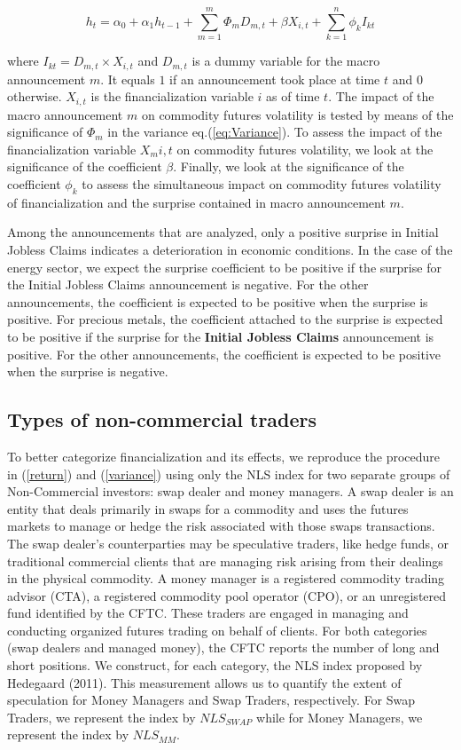 \documentclass[12pt]{article}
\begin{document}
\begin{equation}\label{eq:Variance}
h_{t}=\alpha_0+\alpha_1 h_{t-1}+\sum_{m=1}^m \Phi_m D_{m,t}+\beta X_{i,t}+\sum_{k=1}^n \phi_k I_{kt}
\end{equation}

where $I_{kt}=D_{m,t} \times X_{i,t}$ and $D_{m,t}$ is a dummy variable for the macro announcement $m$. It equals $1$ if an announcement took place at time $t$ and 0 otherwise. $X_{i,t}$  is the financialization variable $i$ as of time $t$. The impact of the macro announcement $m$ on commodity futures volatility is tested by means of the significance of $\Phi_m$ in the variance eq.(\ref{eq:Variance}). To assess the impact of the financialization variable $X_m{i,t}$ on commodity futures volatility, we look at the significance of the coefficient $\beta$. Finally, we look at the significance of the coefficient $\phi_k$ to assess the simultaneous impact on commodity futures volatility of  financialization  and the surprise contained in macro announcement $m$. 

Among the announcements that are analyzed, only a positive surprise in Initial Jobless Claims indicates a deterioration in economic conditions. In the case of the energy sector, we expect the surprise coefficient to be positive if the surprise for the Initial Jobless Claims announcement is negative. For the other announcements, the coefficient is expected to be positive when the surprise is positive. For precious metals, the coefficient attached to the surprise is expected to be positive if the surprise for the \textbf{Initial Jobless Claims} announcement is positive. For the other announcements, the coefficient is expected to be positive when the surprise is negative.

\subsection{Types of non-commercial traders}
To better categorize financialization and its effects, we reproduce the procedure in (\ref{return})  and (\ref{variance}) using only the NLS index for two separate groups of Non-Commercial investors: swap dealer and money managers. A swap dealer is an entity that deals primarily in swaps for a commodity and uses the futures markets to manage or hedge the risk associated with those swaps transactions. The swap dealer’s counterparties may be speculative traders, like hedge funds, or traditional commercial clients that are managing risk arising from their dealings in the physical commodity. A money manager is a registered commodity trading advisor (CTA), a registered commodity pool operator (CPO), or an unregistered fund identified by the CFTC. These traders are engaged in managing and conducting organized futures trading on behalf of clients. For both categories (swap dealers and managed money), the CFTC reports the number of long and short positions. We construct, for each category, the NLS index proposed by Hedegaard (2011). This measurement allows us to quantify the extent of speculation for Money Managers and Swap Traders, respectively. For Swap Traders, we represent the index by $NLS_{SWAP}$ while for Money Managers, we represent the index by $NLS_{MM}$.
\end{document}
